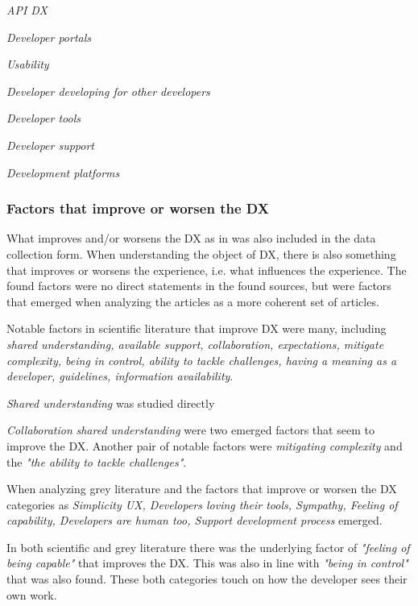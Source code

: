 \documentclass[english, 12pt, a4paper, sci, utf8, a-1b, online]{aaltothesis}
\newcounter{subsubsubsection}[subsubsection]
\begin{document}
\textit{API DX} 

\textit{Developer portals} 

\textit{Usability}

\textit{Developer developing for other developers}

\textit{Developer tools}

\textit{Developer support}

\textit{Development platforms}

\subsubsection{Factors that improve or worsen the DX}

What improves and/or worsens the DX as in \citet{fagerholm-doctoral-thesis} was also included in the data collection form. When understanding the object of DX, there is also something that improves or worsens the experience, i.e. what influences the experience. The found factors were no direct statements in the found sources, but were factors that emerged when analyzing the articles as a more coherent set of articles.


Notable factors in scientific literature that improve DX were many, including \textit{shared understanding,	available support, collaboration, expectations, mitigate complexity, being in control, ability to tackle challenges, having a meaning as a developer, guidelines, information availability}.

\textit{Shared understanding} was studied directly

\textit{Collaboration} \textit{shared understanding} were two emerged factors that seem to improve the DX. Another pair of notable factors were \textit{mitigating complexity} and the \textit{"the ability to tackle challenges"}.


When analyzing grey literature and the factors that improve or worsen the DX categories as \textit{Simplicity	UX, Developers loving their tools, Sympathy, Feeling of capability, Developers are human too, Support development process} emerged.

In both scientific and grey literature there was the underlying factor of \textit{"feeling of being capable"} that improves the DX. This was also in line with \textit{"being in control"} that was also found. These both categories touch on how the developer sees their own work.
\end{document}
